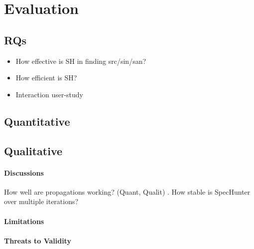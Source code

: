 \section{Evaluation}

\subsection{RQs}
\begin{itemize}
\item How effective is SH in finding src/sin/san?  %
\item How efficient is SH?
\item Interaction user-study %
\end{itemize}


\subsection{Quantitative}

\subsection{Qualitative}

\paragraph{Discussions}
How well are propagations working? (Quant, Qualit) .
How stable is SpecHunter over multiple iterations?
\paragraph{Limitations}


\paragraph{Threats to Validity}

